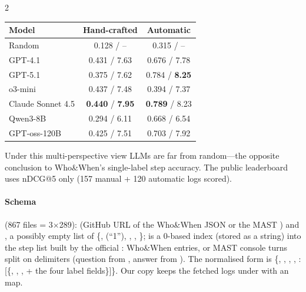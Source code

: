 \begin{multicols}{2}
\begin{center}\small
\begin{tabular}{@{}lcc@{}}\toprule
Model & Hand-crafted & Automatic\\\midrule
Random & 0.128 / -- & 0.315 / --\\
GPT-4.1 & 0.431 / 7.63 & 0.676 / 7.78\\
GPT-5.1 & 0.375 / 7.62 & 0.784 / \textbf{8.25}\\
o3-mini & 0.437 / 7.48 & 0.394 / 7.37\\
Claude Sonnet 4.5 & \textbf{0.440} / \textbf{7.95} & \textbf{0.789} / 8.23\\
Qwen3-8B & 0.294 / 6.11 & 0.668 / 6.54\\
GPT-oss-120B & 0.425 / 7.51 & 0.703 / 7.92\\\bottomrule
\end{tabular}
\end{center}
Under this multi-perspective view LLMs are far from random---the opposite conclusion to Who\&When's single-label step accuracy. The public leaderboard uses nDCG@5 only (157 manual + 120 automatic logs scored).

\paragraph{Schema}  (867 files = 3$\times$289):  (GitHub URL of the Who\&When JSON or the MAST ) and , a possibly empty list of \{,  (``1''), , , \};  is a 0-based index (stored as a string) into the step list built by the official : Who\&When  entries, or MAST console turns split on  delimiters (question from , answer from ). The normalised form is \{, , , , :[\{, , , + the four label fields\}]\}. Our copy keeps the fetched logs under  with an  map.
\end{multicols}

